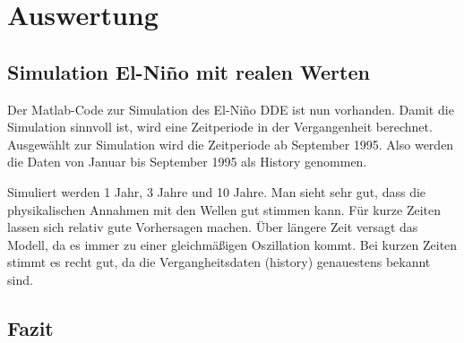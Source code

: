 \section{Auswertung}
\subsection{Simulation El-Niño mit realen Werten}
Der Matlab-Code zur Simulation des El-Niño DDE ist nun vorhanden.
Damit die Simulation sinnvoll ist, wird eine Zeitperiode in der Vergangenheit berechnet.
Ausgewählt zur Simulation wird die Zeitperiode ab September 1995. 
Also werden die Daten von Januar bis September 1995 als History genommen.

Simuliert werden 1 Jahr, 3 Jahre und 10 Jahre.
Man sieht sehr gut, dass die physikalischen Annahmen mit den Wellen gut stimmen kann.
Für kurze Zeiten lassen sich relativ gute Vorhersagen machen.
Über längere Zeit versagt das Modell, da es immer zu einer gleichmäßigen Oszillation kommt.
Bei kurzen Zeiten stimmt es recht gut, da die Vergangheitsdaten (history) genauestens bekannt sind. 



\subsection{Fazit}
